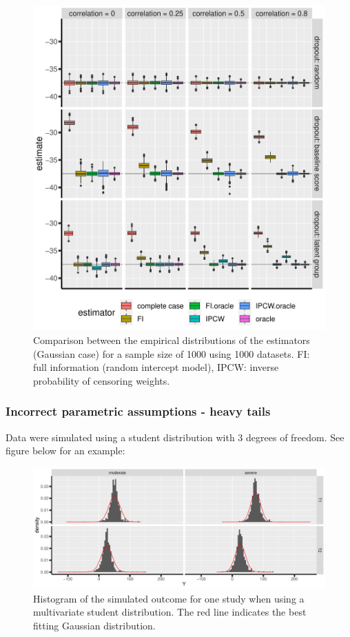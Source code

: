 \documentclass[12pt]{article}
\begin{document}
\begin{figure}[!h]
\centering
\includegraphics[width=\textwidth]{./figures/simStudy-bias.pdf}
\caption{\label{fig:simulationGaussian}Comparison between the empirical distributions of the estimators (Gaussian case) for a sample size of 1000 using 1000 datasets. FI: full information (random intercept model), IPCW: inverse probability of censoring weights.}
\end{figure}

\clearpage

\subsubsection{Incorrect parametric assumptions - heavy tails}
\label{sec:org6c08a2e}

Data were simulated using a student distribution with 3 degrees of
freedom. See figure below for an example:
\begin{figure}[!h]
\centering
\includegraphics[trim={0 0 0 0},width=1\textwidth]{./figures/simStudy-student-hist.pdf}
\caption{\label{fig:student-hist}Histogram of the simulated outcome for one study when using a multivariate student distribution. The red line indicates the best fitting Gaussian distribution.}
\end{figure}
\end{document}
